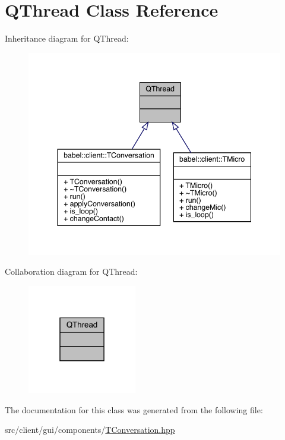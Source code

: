 \hypertarget{class_q_thread}{}\section{Q\+Thread Class Reference}
\label{class_q_thread}


Inheritance diagram for Q\+Thread\+:\nopagebreak
\begin{figure}[H]
\begin{center}
\leavevmode
\includegraphics[width=344pt]{class_q_thread__inherit__graph}
\end{center}
\end{figure}


Collaboration diagram for Q\+Thread\+:\nopagebreak
\begin{figure}[H]
\begin{center}
\leavevmode
\includegraphics[width=135pt]{class_q_thread__coll__graph}
\end{center}
\end{figure}


The documentation for this class was generated from the following file\+:\begin{DoxyCompactItemize}
\item 
src/client/gui/components/\mbox{\hyperlink{_t_conversation_8hpp}{T\+Conversation.\+hpp}}\end{DoxyCompactItemize}
